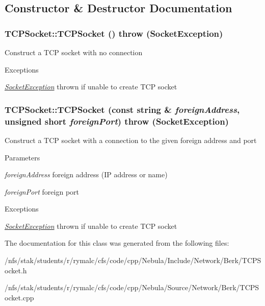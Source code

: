 \subsection{Constructor \& Destructor Documentation}
\hypertarget{classTCPSocket_a7a50427a401d1a6f3209d51818bad901}{
\subsubsection[{TCPSocket}]{\setlength{\rightskip}{0pt plus 5cm}TCPSocket::TCPSocket ()  throw ({\bf SocketException})}}
\label{classTCPSocket_a7a50427a401d1a6f3209d51818bad901}
Construct a TCP socket with no connection 
\begin{DoxyExceptions}{Exceptions}
\item[{\em \hyperlink{classSocketException}{SocketException}}]thrown if unable to create TCP socket \end{DoxyExceptions}
\hypertarget{classTCPSocket_a7b246b66f6dc3246ab2777b771e5f917}{
\subsubsection[{TCPSocket}]{\setlength{\rightskip}{0pt plus 5cm}TCPSocket::TCPSocket (const string \& {\em foreignAddress}, \/  unsigned short {\em foreignPort})  throw ({\bf SocketException})}}
\label{classTCPSocket_a7b246b66f6dc3246ab2777b771e5f917}
Construct a TCP socket with a connection to the given foreign address and port 
\begin{DoxyParams}{Parameters}
\item[{\em foreignAddress}]foreign address (IP address or name) \item[{\em foreignPort}]foreign port \end{DoxyParams}

\begin{DoxyExceptions}{Exceptions}
\item[{\em \hyperlink{classSocketException}{SocketException}}]thrown if unable to create TCP socket \end{DoxyExceptions}


The documentation for this class was generated from the following files:\begin{DoxyCompactItemize}
\item 
/nfs/stak/students/r/rymalc/cfs/code/cpp/Nebula/Include/Network/Berk/TCPSocket.h\item 
/nfs/stak/students/r/rymalc/cfs/code/cpp/Nebula/Source/Network/Berk/TCPSocket.cpp\end{DoxyCompactItemize}
